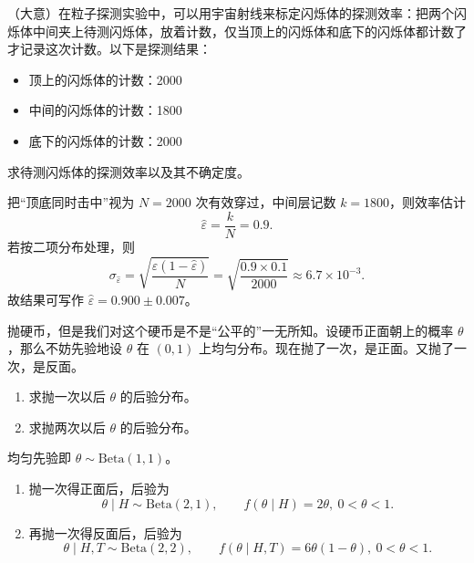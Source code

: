 \begin{question}
（大意）在粒子探测实验中，可以用宇宙射线来标定闪烁体的探测效率：把两个闪烁体中间夹上待测闪烁体，放着计数，仅当顶上的闪烁体和底下的闪烁体都计数了才记录这次计数。以下是探测结果：
\begin{itemize}[leftmargin=2em,itemsep=0.2em,topsep=0.2em]
\item 顶上的闪烁体的计数：2000
\item 中间的闪烁体的计数：1800
\item 底下的闪烁体的计数：2000
\end{itemize}
求待测闪烁体的探测效率以及其不确定度。
\begin{solution}
把“顶底同时击中”视为 $N=2000$ 次有效穿过，中间层记数 $k=1800$，则效率估计
\[
\hat\varepsilon=\frac{k}{N}=0.9.
\]
若按二项分布处理，则
\[
\sigma_{\hat\varepsilon}=\sqrt{\frac{\hat\varepsilon(1-\hat\varepsilon)}{N}}
=\sqrt{\frac{0.9\times 0.1}{2000}}\approx 6.7\times 10^{-3}.
\]
故结果可写作 $\hat\varepsilon=0.900\pm 0.007$。
\end{solution}
\end{question}

\begin{question}
抛硬币，但是我们对这个硬币是不是“公平的”一无所知。设硬币正面朝上的概率 $\theta$，那么不妨先验地设 $\theta$ 在 $(0,1)$ 上均匀分布。现在抛了一次，是正面。又抛了一次，是反面。
\begin{enumerate}[label=(\alph*),leftmargin=2.8em,itemsep=0.2em]
\item 求抛一次以后 $\theta$ 的后验分布。
\item 求抛两次以后 $\theta$ 的后验分布。
\end{enumerate}
\begin{solution}
均匀先验即 $\theta\sim \mathrm{Beta}(1,1)$。
\begin{enumerate}[label=(\arabic*),leftmargin=2.8em,itemsep=0.2em]
\item 抛一次得正面后，后验为
\[
\theta\mid H\sim \mathrm{Beta}(2,1),\qquad f(\theta\mid H)=2\theta,\ 0<\theta<1.
\]
\item 再抛一次得反面后，后验为
\[
\theta\mid H,T\sim \mathrm{Beta}(2,2),\qquad f(\theta\mid H,T)=6\theta(1-\theta),\ 0<\theta<1.
\]
\end{enumerate}
\end{solution}
\end{question}

